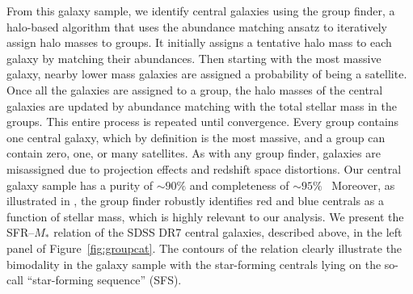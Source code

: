 \documentclass[12pt, letterpaper, preprint, tighten]{aastex62}
\newcommand{\todo}[1]{{\bf \textcolor{red}{#1}}}
\begin{document}
From this galaxy sample, we identify central galaxies using the 
\cite{tinker2011} group finder, a halo-based algorithm that uses 
the abundance matching ansatz to iteratively assign halo masses to groups. 
It initially assigns a tentative halo mass to each galaxy by matching their 
abundances. Then starting with the most massive galaxy, nearby lower
mass galaxies are assigned a probability of being a satellite. Once all 
the galaxies are assigned to a group, the halo masses of the central galaxies 
are updated by abundance matching with the total stellar mass in the groups. 
This entire process is repeated until convergence. Every group contains one 
central galaxy, which by definition is the most massive, and a group can 
contain zero, one, or many satellites.
As with any group finder, galaxies are misassigned due to projection 
effects and redshift space distortions. Our central galaxy sample has
a purity of ${\sim}90\%$ and completeness of ${\sim}95\%$~\citep{tinker2017}
Moreover, as illustrated in \cite{campbell2015}, the \cite{tinker2011} group
finder robustly identifies red and blue centrals as a function of stellar mass, 
which is highly relevant to our analysis.  
We present the SFR--$M_*$ relation of the SDSS DR7 central galaxies, described 
above, in the left panel of Figure~\ref{fig:groupcat}. The contours of the 
relation clearly illustrate the bimodality in the galaxy sample with the 
star-forming centrals lying on the so-call ``star-forming sequence'' (SFS). 
\end{document}
